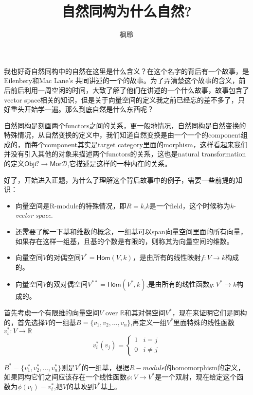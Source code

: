 \documentclass[UTF8,11pt,a4paper]{ctexart}%
\begin{document}
\newcommand*{\xfunc}[4]{{#2}\colon{#3}{#1}{#4}}
\newcommand*{\func}[3]{\xfunc{\to}{#1}{#2}{#3}}
 
\title{自然同构为什么自然?}
\author{枫聆}
\maketitle

我也好奇自然同构中的自然在这里是什么含义？在这个名字的背后有一个故事，是Eilenbery和Mac Lane's 共同讲述的一个的故事。为了弄清楚这个故事的含义，前后前后利用一周空闲的时间，大致了解了他们在讲述的一个什么故事，故事包含了vector space相关的知识，但是关于向量空间的定义我之前已经忘的差不多了，只好重头开始学一遍。那么到底自然是什么东西呢？

自然同构是刻画两个functors之间的关系，更一般地情况，自然同构是自然变换的特殊情况，从自然变换的定义中，我们知道自然变换是由一个一个的component组成的，而每个component其实是target category里面的morphism，这样看起来我们并没有引入其他的对象来描述两个functors的关系，这也是natural transformation的定义$\textsf{Obj}\mathcal{C} \rightarrow \textsf{Mor}\mathcal{D}$,它描述是这样的一种内在的关系。

好了，开始进入正题，为什么了理解这个背后故事中的例子，需要一些前提的知识：

\begin{itemize}
	\item 向量空间是R-module的特殊情况，即$R=k$,$k$是一个field，这个时候称为\textsl{k-vector space}.
	\item 还需要了解一下基和维数的概念，一组基可以span向量空间里面的所有向量，如果存在这样一组基，且基的个数是有限的，则称其为向量空间的维数。
	\item 向量空间$V$的对偶空间$V^{*}=\textsf{Hom}(V,k)$，是由所有的线性映射$\func{f}{V}{k}$构成的。
	\item 向量空间$V$的双对偶空间$V^{**}=\textsf{Hom}(V^{*},k)$,是由所有的线性函数$\func{g}{V^{*}}{k}$构成的。
	
\end{itemize}

首先考虑一个有限维的向量空间$V$ over $\mathbb{R}$和其对偶空间$V^{*}$，现在来证明它们是同构的，首先选择$V$的一组基$B=\{v_1,v_2,\ldots,v_n\}$,再定义一组$V^{*}$里面特殊的线性函数$\func{v_i^{*}}{V}{\mathbb{R}}$ 
	\[v_i^{*}(v_j)=\left\{ 
	\begin{array}{rcl}
	1 & i=j \\
	0 & i\neq j
	\end{array}
	\right.
	\]
	
$B^{*}=\{v_1^{*},v_2^{*},\ldots,v_n^{*}\}$则是$V^{*}$的一组基，根据$R-module$的homomorphism的定义，如果同构它们之间应该存在一个线性函数$\func{\phi}{V}{V^{*}}$是一个双射，现在给定这个函数为$\phi(v_i)=v_i^{*}$,把$V$的基映到$V^{*}$基上。
\end{document}
